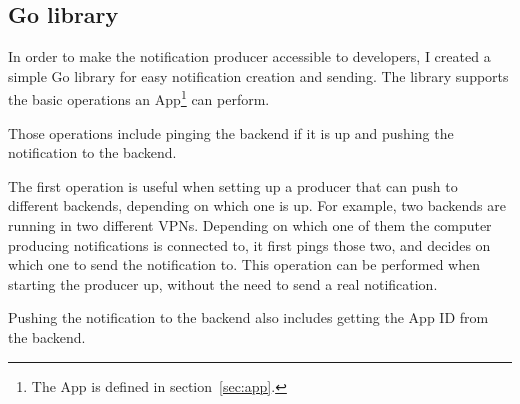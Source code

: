 \subsection{Go library}\label{sec:producer-go-library}

In order to make the notification producer
accessible to developers,
I created a simple Go library
for easy notification creation and sending.
The library supports the basic operations
an App\footnote{
  The App is defined in section~\ref{sec:app}.
} can perform.

Those operations include pinging the backend if it is up
and pushing the notification to the backend.

The first operation is useful when setting up
a producer that can push to different backends,
depending on which one is up.
For example,
two backends are running
in two different VPNs.
Depending on which one of them
the computer producing notifications
is connected to,
it first pings those two,
and decides on which one to send the notification to.
This operation can be performed
when starting the producer up,
without the need to send a real notification.

Pushing the notification to the backend
also includes getting the App ID from the backend.
